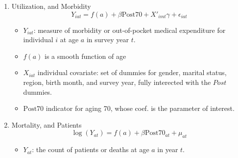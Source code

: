 \documentclass[../root]{subfiles}
\begin{document}
    \begin{enumerate}
      \item Utilization, and Morbidity
      \[
      Y_{iat} = f(a) + \beta \text{Post70} + X'_{imt} \gamma + \epsilon_{iat}
      \]
      \begin{itemize}
        \item $Y_{iat}$: measure of morbidity or out-of-pocket medical expenditure for individual $i$ at age $a$ in survey year $t$.
        \item $f(a)$ is a smooth function of age
        \item $X_{iat}$ individual covariate: set of dummies for gender, marital status, region, birth month, and survey year, fully interected with the $Post$ dummies.
        \item $\text{Post70}$ indicator for aging 70, whose coef. is the parameter of interest.
      \end{itemize}
      \item Mortality, and Patients
      \[
      \log(Y_{at}) = f(a) + \beta \text{Post}70_{at} + \mu_{at}
      \]
      \begin{itemize}
        \item $Y_{at}$: the count of patients or deaths at age $a$ in year $t$.
      \end{itemize}
    \end{enumerate}
\end{document}
